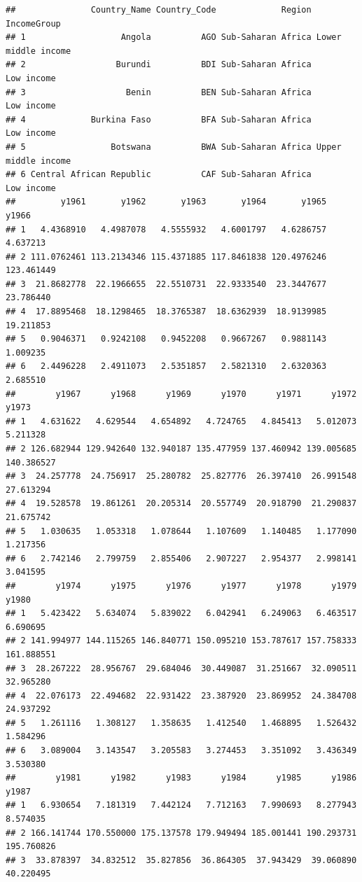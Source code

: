 \documentclass[
]{book}
\begin{document}
\begin{verbatim}
##               Country_Name Country_Code             Region         IncomeGroup
## 1                   Angola          AGO Sub-Saharan Africa Lower middle income
## 2                  Burundi          BDI Sub-Saharan Africa          Low income
## 3                    Benin          BEN Sub-Saharan Africa          Low income
## 4             Burkina Faso          BFA Sub-Saharan Africa          Low income
## 5                 Botswana          BWA Sub-Saharan Africa Upper middle income
## 6 Central African Republic          CAF Sub-Saharan Africa          Low income
##         y1961       y1962       y1963       y1964       y1965      y1966
## 1   4.4368910   4.4987078   4.5555932   4.6001797   4.6286757   4.637213
## 2 111.0762461 113.2134346 115.4371885 117.8461838 120.4976246 123.461449
## 3  21.8682778  22.1966655  22.5510731  22.9333540  23.3447677  23.786440
## 4  17.8895468  18.1298465  18.3765387  18.6362939  18.9139985  19.211853
## 5   0.9046371   0.9242108   0.9452208   0.9667267   0.9881143   1.009235
## 6   2.4496228   2.4911073   2.5351857   2.5821310   2.6320363   2.685510
##        y1967      y1968      y1969      y1970      y1971      y1972      y1973
## 1   4.631622   4.629544   4.654892   4.724765   4.845413   5.012073   5.211328
## 2 126.682944 129.942640 132.940187 135.477959 137.460942 139.005685 140.386527
## 3  24.257778  24.756917  25.280782  25.827776  26.397410  26.991548  27.613294
## 4  19.528578  19.861261  20.205314  20.557749  20.918790  21.290837  21.675742
## 5   1.030635   1.053318   1.078644   1.107609   1.140485   1.177090   1.217356
## 6   2.742146   2.799759   2.855406   2.907227   2.954377   2.998141   3.041595
##        y1974      y1975      y1976      y1977      y1978      y1979      y1980
## 1   5.423422   5.634074   5.839022   6.042941   6.249063   6.463517   6.690695
## 2 141.994977 144.115265 146.840771 150.095210 153.787617 157.758333 161.888551
## 3  28.267222  28.956767  29.684046  30.449087  31.251667  32.090511  32.965280
## 4  22.076173  22.494682  22.931422  23.387920  23.869952  24.384708  24.937292
## 5   1.261116   1.308127   1.358635   1.412540   1.468895   1.526432   1.584296
## 6   3.089004   3.143547   3.205583   3.274453   3.351092   3.436349   3.530380
##        y1981      y1982      y1983      y1984      y1985      y1986      y1987
## 1   6.930654   7.181319   7.442124   7.712163   7.990693   8.277943   8.574035
## 2 166.141744 170.550000 175.137578 179.949494 185.001441 190.293731 195.760826
## 3  33.878397  34.832512  35.827856  36.864305  37.943429  39.060890  40.220495

\end{verbatim}
\end{document}
